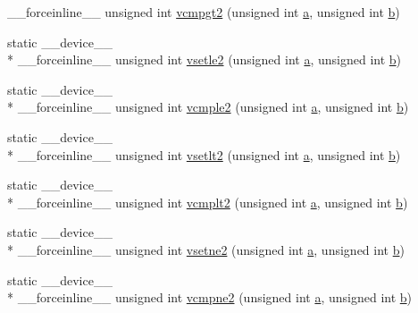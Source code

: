\begin{DoxyCompactItemize}
\-\_\-\-\_\-forceinline\-\_\-\-\_\- unsigned int \hyperlink{namespacecv_1_1gpu_1_1device_a485f033d91240200825ce6cf602a678e}{vcmpgt2} (unsigned int \hyperlink{legacy_8hpp_a1031d0e0a97a340abfe0a6ab9e831045}{a}, unsigned int \hyperlink{legacy_8hpp_ac04272e8ca865b8fba18d36edae9fd2a}{b})
\item 
static \-\_\-\-\_\-device\-\_\-\-\_\- \\*
\-\_\-\-\_\-forceinline\-\_\-\-\_\- unsigned int \hyperlink{namespacecv_1_1gpu_1_1device_a5decd4502716f06d3628952808e44950}{vsetle2} (unsigned int \hyperlink{legacy_8hpp_a1031d0e0a97a340abfe0a6ab9e831045}{a}, unsigned int \hyperlink{legacy_8hpp_ac04272e8ca865b8fba18d36edae9fd2a}{b})
\item 
static \-\_\-\-\_\-device\-\_\-\-\_\- \\*
\-\_\-\-\_\-forceinline\-\_\-\-\_\- unsigned int \hyperlink{namespacecv_1_1gpu_1_1device_a54c0068b3200f90f6b590068f3678247}{vcmple2} (unsigned int \hyperlink{legacy_8hpp_a1031d0e0a97a340abfe0a6ab9e831045}{a}, unsigned int \hyperlink{legacy_8hpp_ac04272e8ca865b8fba18d36edae9fd2a}{b})
\item 
static \-\_\-\-\_\-device\-\_\-\-\_\- \\*
\-\_\-\-\_\-forceinline\-\_\-\-\_\- unsigned int \hyperlink{namespacecv_1_1gpu_1_1device_ab767ec87f48e2d4f16c70bc3760521ae}{vsetlt2} (unsigned int \hyperlink{legacy_8hpp_a1031d0e0a97a340abfe0a6ab9e831045}{a}, unsigned int \hyperlink{legacy_8hpp_ac04272e8ca865b8fba18d36edae9fd2a}{b})
\item 
static \-\_\-\-\_\-device\-\_\-\-\_\- \\*
\-\_\-\-\_\-forceinline\-\_\-\-\_\- unsigned int \hyperlink{namespacecv_1_1gpu_1_1device_a5a8543b580704435cb501163e52745e4}{vcmplt2} (unsigned int \hyperlink{legacy_8hpp_a1031d0e0a97a340abfe0a6ab9e831045}{a}, unsigned int \hyperlink{legacy_8hpp_ac04272e8ca865b8fba18d36edae9fd2a}{b})
\item 
static \-\_\-\-\_\-device\-\_\-\-\_\- \\*
\-\_\-\-\_\-forceinline\-\_\-\-\_\- unsigned int \hyperlink{namespacecv_1_1gpu_1_1device_abe3b0ab9aeeb6fbb57d193189b8c1ddb}{vsetne2} (unsigned int \hyperlink{legacy_8hpp_a1031d0e0a97a340abfe0a6ab9e831045}{a}, unsigned int \hyperlink{legacy_8hpp_ac04272e8ca865b8fba18d36edae9fd2a}{b})
\item 
static \-\_\-\-\_\-device\-\_\-\-\_\- \\*
\-\_\-\-\_\-forceinline\-\_\-\-\_\- unsigned int \hyperlink{namespacecv_1_1gpu_1_1device_ac8373fe447daadd015ec0d297d762e89}{vcmpne2} (unsigned int \hyperlink{legacy_8hpp_a1031d0e0a97a340abfe0a6ab9e831045}{a}, unsigned int \hyperlink{legacy_8hpp_ac04272e8ca865b8fba18d36edae9fd2a}{b})

\end{DoxyCompactItemize}
